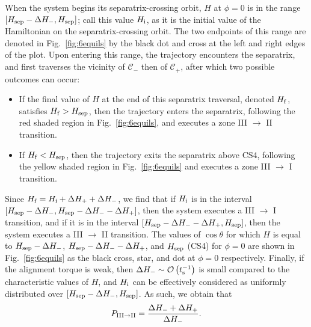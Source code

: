 \documentclass[
        fleqn,
        usenatbib,
    ]{mnras}
\newcommand*{\p}[1]{\left(#1\right)}
\newcommand*{\s}[1]{\left[#1\right]}
\begin{document}
When the system begins its separatrix-crossing orbit, $H$ at $\phi = 0$ is in
the range $\s{H_{\rm sep} - \Delta H_-, H_{\rm sep}}$; call this value $H_{\rm
i}$, as it is the initial value of the Hamiltonian on the separatrix-crossing
orbit. The two endpoints of this range are denoted in Fig.~\ref{fig:6equils} by
the black dot and cross at the left and right edges of the plot. Upon entering
this range, the trajectory encounters the separatrix, and first traverses the
vicinity of $\mathcal{C}_-$ then of $\mathcal{C}_+$, after which two possible
outcomes can occur:
\begin{itemize}
    \item If the final value of $H$ at the end of this separatrix traversal,
        denoted $H_{\rm f}$, satisfies $H_{\rm f} > H_{\rm sep}$, then the
        trajectory enters the separatrix, following the red shaded region in
        Fig.~\ref{fig:6equils}, and executes a zone III $\to$ II transition.

    \item If $H_{\rm f} < H_{\rm sep}$, then the trajectory exits the separatrix
        above CS4, following the yellow shaded region in Fig.~\ref{fig:6equils}
        and executes a zone III $\to$ I transition.
\end{itemize}
Since $H_{\rm f} = H_{\rm i} + \Delta H_+ + \Delta H_-$, we find that if $H_{\rm
i}$ is in the interval $\s{H_{\rm sep} - \Delta H_-, H_{\rm sep} - \Delta H_{-}
- \Delta H_+}$, then the system executes a III $\to$ I transition, and if it
is in the interval $\s{H_{\rm sep} - \Delta H_- - \Delta H_+, H_{\rm sep}}$,
then the system executes a III $\to$ II transition. The values of $\cos
\theta$ for which $H$ is equal to $H_{\rm sep} - \Delta H_-$, $H_{\rm sep} - \Delta
H_- - \Delta H_+$, and $H_{\rm sep}$ (CS4) for $\phi = 0$ are shown in
Fig.~\ref{fig:6equils} as the black cross, star, and dot at $\phi = 0$
respectively. Finally, if the alignment torque is weak, then $\Delta H_- \sim
\mathcal{O}\p{t_{\rm s}^{-1}}$ is small compared to the characteristic values of
$H$, and $H_{\rm i}$ can be effectively considered as uniformly distributed over
$\s{H_{\rm sep} - \Delta H_-, H_{\rm sep}}$. As such, we obtain that
\begin{equation}
    P_{\rm III \to II} = \frac{\Delta H_- + \Delta H_+}{\Delta H_-}.
        \label{eq:def_P32_toy}
\end{equation}
\end{document}

